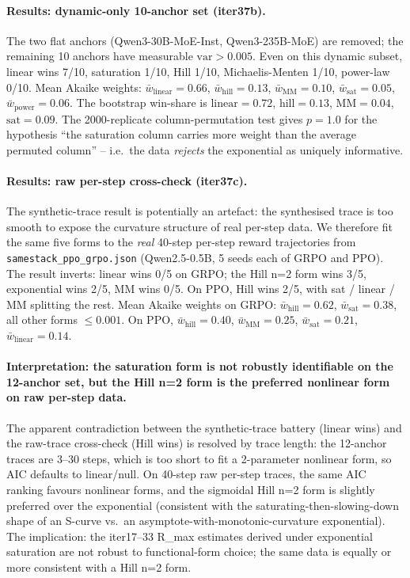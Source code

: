 \paragraph{Results: dynamic-only 10-anchor set (iter37b).}
The two flat anchors (Qwen3-30B-MoE-Inst, Qwen3-235B-MoE) are removed;
the remaining 10 anchors have measurable $\mathrm{var}>0.005$. Even
on this dynamic subset, linear wins 7/10, saturation 1/10, Hill 1/10,
Michaelis-Menten 1/10, power-law 0/10. Mean Akaike weights:
$\bar{w}_{\mathrm{linear}}=0.66$, $\bar{w}_{\mathrm{hill}}=0.13$,
$\bar{w}_{\mathrm{MM}}=0.10$, $\bar{w}_{\mathrm{sat}}=0.05$,
$\bar{w}_{\mathrm{power}}=0.06$. The bootstrap win-share is
$\mathrm{linear}=0.72$, $\mathrm{hill}=0.13$, $\mathrm{MM}=0.04$,
$\mathrm{sat}=0.09$. The 2000-replicate column-permutation test gives
$p=1.0$ for the hypothesis ``the saturation column carries more
weight than the average permuted column'' -- i.e.\ the data
\emph{rejects} the exponential as uniquely informative.

\paragraph{Results: raw per-step cross-check (iter37c).}
The synthetic-trace result is potentially an artefact: the
synthesised trace is too smooth to expose the curvature structure
of real per-step data. We therefore fit the same five forms to the
\emph{real} 40-step per-step reward trajectories from
\texttt{samestack\_ppo\_grpo.json} (Qwen2.5-0.5B, 5 seeds each of
GRPO and PPO). The result inverts: linear wins 0/5 on GRPO; the
Hill n=2 form wins 3/5, exponential wins 2/5, MM wins 0/5. On PPO,
Hill wins 2/5, with sat / linear / MM splitting the rest. Mean
Akaike weights on GRPO: $\bar{w}_{\mathrm{hill}}=0.62$,
$\bar{w}_{\mathrm{sat}}=0.38$, all other forms $\le 0.001$. On PPO,
$\bar{w}_{\mathrm{hill}}=0.40$, $\bar{w}_{\mathrm{MM}}=0.25$,
$\bar{w}_{\mathrm{sat}}=0.21$, $\bar{w}_{\mathrm{linear}}=0.14$.

\paragraph{Interpretation: the saturation form is not robustly
identifiable on the 12-anchor set, but the Hill n=2 form is the
preferred nonlinear form on raw per-step data.}
The apparent contradiction between the synthetic-trace battery
(linear wins) and the raw-trace cross-check (Hill wins) is resolved
by trace length: the 12-anchor traces are 3--30 steps, which is too
short to fit a 2-parameter nonlinear form, so AIC defaults to
linear/null. On 40-step raw per-step traces, the same AIC ranking
favours nonlinear forms, and the sigmoidal Hill n=2 form is
slightly preferred over the exponential (consistent with the
saturating-then-slowing-down shape of an S-curve vs.\ an
asymptote-with-monotonic-curvature exponential). The
implication: the iter17--33 R_max estimates derived under
exponential saturation are not robust to functional-form choice;
the same data is equally or more consistent with a Hill
n=2 form.

